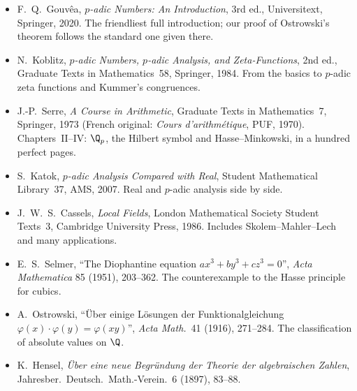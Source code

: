 \begin{itemize}
\item F.~Q.~Gouv\^ea, \emph{$p$-adic Numbers: An Introduction}, 3rd ed., Universitext, Springer, 2020. The friendliest full introduction; our proof of Ostrowski's theorem follows the standard one given there.
\item N.~Koblitz, \emph{$p$-adic Numbers, $p$-adic Analysis, and Zeta-Functions}, 2nd ed., Graduate Texts in Mathematics~58, Springer, 1984. From the basics to $p$-adic zeta functions and Kummer's congruences.
\item J.-P.~Serre, \emph{A Course in Arithmetic}, Graduate Texts in Mathematics~7, Springer, 1973 (French original: \emph{Cours d'arithm\'etique}, PUF, 1970). Chapters~II--IV: $\Q_p$, the Hilbert symbol and Hasse--Minkowski, in a hundred perfect pages.
\item S.~Katok, \emph{$p$-adic Analysis Compared with Real}, Student Mathematical Library~37, AMS, 2007. Real and $p$-adic analysis side by side.
\item J.~W.~S.~Cassels, \emph{Local Fields}, London Mathematical Society Student Texts~3, Cambridge University Press, 1986. Includes Skolem--Mahler--Lech and many applications.
\item E.~S.~Selmer, ``The Diophantine equation $ax^3+by^3+cz^3=0$'', \emph{Acta Mathematica} 85 (1951), 203--362. The counterexample to the Hasse principle for cubics.
\item A.~Ostrowski, ``\"Uber einige L\"osungen der Funktionalgleichung $\varphi(x)\cdot\varphi(y)=\varphi(xy)$'', \emph{Acta Math.}\ 41 (1916), 271--284. The classification of absolute values on $\Q$.
\item K.~Hensel, \emph{\"Uber eine neue Begr\"undung der Theorie der algebraischen Zahlen}, Jahresber.\ Deutsch.\ Math.-Verein.\ 6 (1897), 83--88.
\end{itemize}
